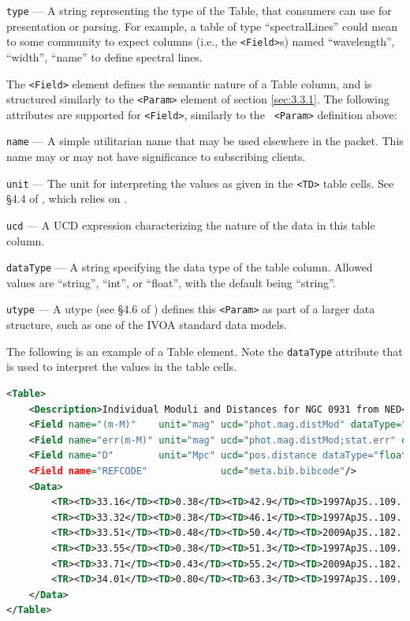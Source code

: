 \documentclass[11pt,a4paper]{ivoa}
\begin{document}
 {\tt type}\label{sec:3.3.3.2} --- A string representing 
the type of the Table, that consumers can use for presentation or parsing. For 
example, a table of type ``spectralLines'' could mean to some community to 
expect columns (i.e., the {\tt <Field>}s) named ``wavelength'', ``width'', 
``name'' to define spectral lines. 

The {\tt <Field>} element defines the semantic nature of a Table column, and is 
structured similarly to the {\tt <Param>} element of section \ref{sec:3.3.1}. 
The following attributes are supported for {\tt <Field>}, similarly to the {\tt 
<Param>} definition above: 

 {\tt name}\label{sec:3.3.3.3} --- A simple utilitarian 
name that may be used elsewhere in the packet. This name may or may not have 
significance to subscribing clients. 

 {\tt unit}\label{sec:3.3.3.4} --- The unit for 
interpreting the values as given in the {\tt <TD>} table cells. See \S4.4 of 
\citep{2019ivoa.spec.1021O}, which relies on \citep{2014ivoa.spec.0523D}. 

 {\tt ucd}\label{sec:3.3.3.5} --- A UCD 
\citep{2018ivoa.spec.0527M} expression characterizing the nature of the data in 
this table column. 

 {\tt dataType}\label{sec:3.3.3.6} --- A string specifying 
the data type of the table column. Allowed values are ``string'', ``int'', or 
``float'', with the default being ``string''.
 
 {\tt utype}\label{sec:3.3.3.7} --- A utype (see \S4.6 of 
\citep{2019ivoa.spec.1021O}) defines this {\tt <Param>} as part of a larger data 
structure, such as one of the IVOA standard data models. 
 
 The following is an example of a Table element. Note the {\tt dataType} 
 attribute that is used to interpret the values in the table cells. 
\begin{lstlisting}[language=XML]
<Table>
    <Description>Individual Moduli and Distances for NGC 0931 from NED</Description>
    <Field name="(m-M)"    unit="mag" ucd="phot.mag.distMod" dataType="float"/>
    <Field name="err(m-M)" unit="mag" ucd="phot.mag.distMod;stat.err" dataType="float"/>
    <Field name="D"        unit="Mpc" ucd="pos.distance dataType="float"/>
    <Field name="REFCODE"             ucd="meta.bib.bibcode"/>
    <Data>
        <TR><TD>33.16</TD><TD>0.38</TD><TD>42.9</TD><TD>1997ApJS..109..333W</TD></TR>
        <TR><TD>33.32</TD><TD>0.38</TD><TD>46.1</TD><TD>1997ApJS..109..333W</TD></TR>
        <TR><TD>33.51</TD><TD>0.48</TD><TD>50.4</TD><TD>2009ApJS..182..474S</TD></TR>
        <TR><TD>33.55</TD><TD>0.38</TD><TD>51.3</TD><TD>1997ApJS..109..333W</TD></TR>
        <TR><TD>33.71</TD><TD>0.43</TD><TD>55.2</TD><TD>2009ApJS..182..474S</TD></TR>
        <TR><TD>34.01</TD><TD>0.80</TD><TD>63.3</TD><TD>1997ApJS..109..333W</TD></TR>
    </Data>
</Table> 
\end{lstlisting}
\end{document}
